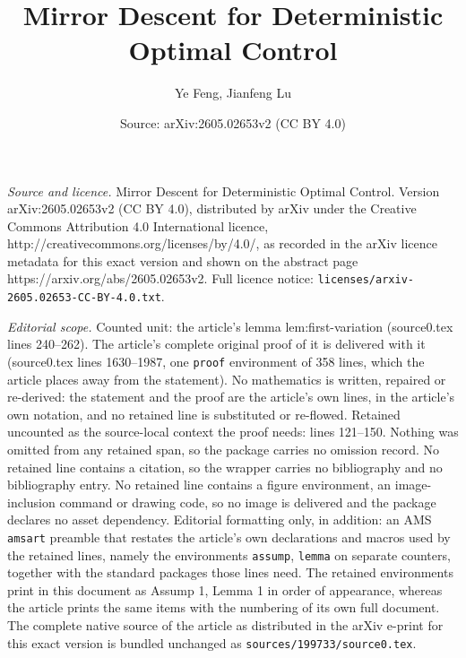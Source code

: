 \documentclass[10pt,a4paper]{amsart}
\title{Mirror Descent for Deterministic Optimal Control}
\author{Ye Feng, Jianfeng Lu}
\date{Source: arXiv:2605.02653v2 (CC BY 4.0)}
\begin{document}
\maketitle

\noindent\emph{Source and licence.} Mirror Descent for Deterministic Optimal Control. Version arXiv:2605.02653v2 (CC BY 4.0), distributed by arXiv under the Creative Commons Attribution 4.0 International licence, http://creativecommons.org/licenses/by/4.0/, as recorded in the arXiv licence metadata for this exact version and shown on the abstract page https://arxiv.org/abs/2605.02653v2. Full licence notice: \texttt{licenses/arxiv-2605.02653-CC-BY-4.0.txt}.\par\smallskip

\noindent\textit{Editorial scope.} Counted unit: the article's lemma lem:first-variation (source0.tex lines 240--262). The article's complete original proof of it is delivered with it (source0.tex lines 1630--1987, one \texttt{proof} environment of 358 lines, which the article places away from the statement). No mathematics is written, repaired or re-derived: the statement and the proof are the article's own lines, in the article's own notation, and no retained line is substituted or re-flowed.  Retained uncounted as the source-local context the proof needs: lines 121--150.  Nothing was omitted from any retained span, so the package carries no omission record.  No retained line contains a citation, so the wrapper carries no bibliography and no bibliography entry.  No retained line contains a figure environment, an image-inclusion command or drawing code, so no image is delivered and the package declares no asset dependency.  Editorial formatting only, in addition: an AMS \texttt{amsart} preamble that restates the article's own declarations and macros used by the retained lines, namely the environments \texttt{assump}, \texttt{lemma} on separate counters, together with the standard packages those lines need.  The retained environments print in this document as Assump 1, Lemma 1 in order of appearance, whereas the article prints the same items with the numbering of its own full document.  The complete native source of the article as distributed in the arXiv e-print for this exact version is bundled unchanged as \texttt{sources/199733/source0.tex}.
\end{document}
